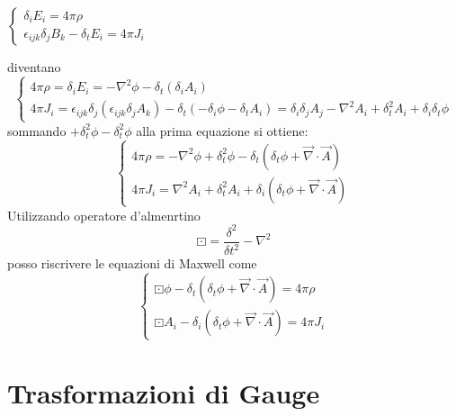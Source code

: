 $\begin{cases}
    \delta_iE_i = 4\pi \rho  \\
    \epsilon_{ijk} \delta_jB_k - \delta_t E_i = 4 \pi J_i 
\end{cases}$ \newline

\noindent diventano
\begin{equation*}
    \begin{cases}
        4\pi \rho = \delta_iE_i = - \nabla^2 \phi - \delta_t (\delta_iA_i) \\
        4 \pi J_i = \epsilon_{ijk} \delta_j (\epsilon_{ijk} \delta_j A_k) - \delta_t (-\delta_i \phi - \delta_t A_i) = \delta_i\delta_j A_j - \nabla^2 A_i + \delta^2_t A_i + \delta_i\delta_t\phi
    \end{cases}
\end{equation*}
sommando $+ \delta_t^2 \phi - \delta_t^2 \phi$ alla prima equazione si ottiene:
\begin{equation*}
    \begin{cases}
        4 \pi \rho = - \nabla^2 \phi + \delta_t^2 \phi - \delta_t (\delta_t \phi + \vec{\nabla} \cdot \vec{A}) \\
        4 \pi J_i = \nabla^2 A_i + \delta_t^2 A_i +\delta_i (\delta_t \phi + \vec{\nabla} \cdot \vec{A})
    \end{cases}
\end{equation*}
Utilizzando operatore d'almenrtino 
\begin{equation*}
    \boxdot = \frac{\delta^2}{\delta t^2 } - \nabla^2
\end{equation*}
posso riscrivere le equazioni di Maxwell come
\begin{equation*}
    \begin{cases}
        \boxdot \phi - \delta_t (\delta_t \phi + \vec{\nabla} \cdot \vec{A}) = 4 \pi \rho \\
        \boxdot A_i - \delta_i (\delta_t \phi + \vec{\nabla} \cdot \vec{A}) = 4 \pi J_i
    \end{cases}
\end{equation*}

\section*{Trasformazioni di Gauge}

